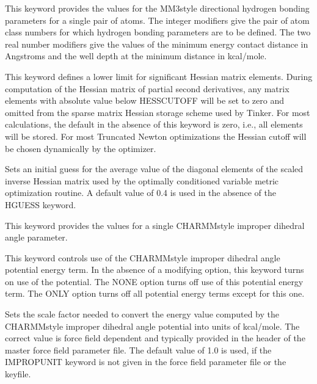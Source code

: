 \documentclass[letterpaper,11pt,english]{sphinxmanual}
\begin{document}
  This keyword provides the values for the MM3\sphinxhyphen{}style directional hydrogen bonding parameters for a single pair of atoms. The integer modifiers give the pair of atom class numbers for which hydrogen bonding parameters are to be defined. The two real number modifiers give the values of the minimum energy contact distance in Angstroms and the well depth at the minimum distance in kcal/mole.


  This keyword defines a lower limit for significant Hessian matrix elements. During computation of the Hessian matrix of partial second derivatives, any matrix elements with absolute value below HESS\sphinxhyphen{}CUTOFF will be set to zero and omitted from the sparse matrix Hessian storage scheme used by Tinker. For most calculations, the default in the absence of this keyword is zero, i.e., all elements will be stored. For most Truncated Newton optimizations the Hessian cutoff will be chosen dynamically by the optimizer.

  Sets an initial guess for the average value of the diagonal elements of the scaled inverse Hessian matrix used by the optimally conditioned variable metric optimization routine. A default value of 0.4 is used in the absence of the HGUESS keyword.


  This keyword provides the values for a single CHARMM\sphinxhyphen{}style improper dihedral angle parameter.

  This keyword controls use of the CHARMM\sphinxhyphen{}style improper dihedral angle potential energy term. In the absence of a modifying option, this keyword turns on use of the potential. The NONE option turns off use of this potential energy term. The ONLY option turns off all potential energy terms except for this one.

  Sets the scale factor needed to convert the energy value computed by the CHARMM\sphinxhyphen{}style improper dihedral angle potential into units of kcal/mole. The correct value is force field dependent and typically provided in the header of the master force field parameter file. The default value of 1.0 is used, if the IMPROPUNIT keyword is not given in the force field parameter file or the keyfile.
\end{document}
